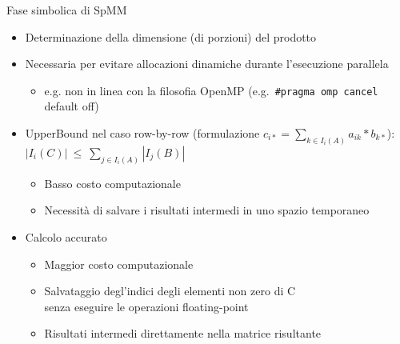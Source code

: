 \begin{frame}[fragile] {Fase simbolica di SpMM}
\begin{itemize}
	\item	Determinazione della dimensione (di porzioni) del prodotto
	\pause
	\item	Necessaria per evitare allocazioni dinamiche durante l'esecuzione parallela
	\begin{itemize}
		\item	e.g. non in linea con la filosofia OpenMP (e.g. \verb|#pragma omp cancel| default off)
	\end{itemize}
	\pause
	\voidLine
	\item	UpperBound nel caso row-by-row (formulazione $c_{i*} = \sum\limits_{k \in I_i(A)}  a_{ik} \ast  b_{k*}$):\\
	$| I_i(C) |~\leq~\sum\limits_{ j \in I_i(A) }  | I_j(B)  |$
	\begin{itemize}
		\item	Basso costo computazionale
		\item	Necessità di salvare i risultati intermedi in uno spazio temporaneo
	\end{itemize}
	\pause
	\item	Calcolo accurato
	\begin{itemize}
		\item	Maggior costo computazionale
		\item	Salvataggio degl'indici degli elementi non zero di C\\
				senza eseguire le operazioni floating-point
		\item	Risultati intermedi direttamente nella matrice risultante
	\end{itemize}
\end{itemize}
\end{frame}


